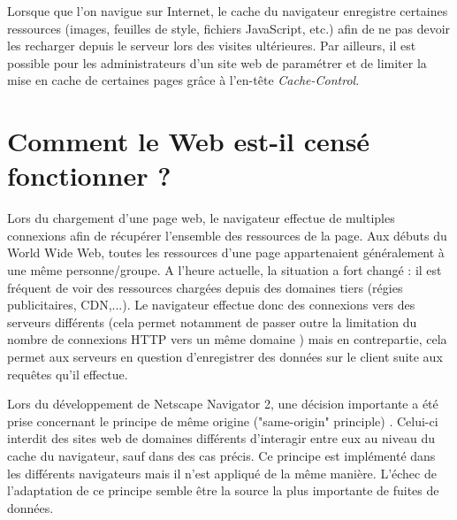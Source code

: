 Lorsque que l'on navigue sur Internet, le cache du navigateur enregistre certaines ressources (images, feuilles de style, fichiers JavaScript, etc.) afin de ne pas devoir les recharger depuis le serveur lors des visites ultérieures. Par ailleurs, il est possible pour les administrateurs d'un site web de paramétrer et de limiter la mise en cache de certaines pages grâce à l'en-tête \textit{Cache-Control}.


\section{Comment le Web est-il censé fonctionner ?}
\label{web-expl}
Lors du chargement d'une page web, le navigateur effectue de multiples connexions afin de récupérer l'ensemble des ressources de la page. Aux débuts du World Wide Web, toutes les ressources d'une page appartenaient généralement à une même personne/groupe. A l'heure actuelle, la situation a fort changé : il est fréquent de voir des ressources chargées depuis des domaines tiers (régies publicitaires, CDN,...). Le navigateur effectue donc des connexions vers des serveurs différents (cela permet notamment de passer outre la limitation du nombre de connexions HTTP vers un même domaine \cite{IETF_RFC2616}) mais en contrepartie, cela permet aux serveurs en question d'enregistrer des données sur le client suite aux requêtes qu'il effectue.
\newline

Lors du développement de Netscape Navigator 2, une décision importante a été prise concernant le principe de même origine ("same-origin" principle) \cite{Jackson:2006:PBS:1135777.1135884}. Celui-ci interdit des sites web de domaines différents d'interagir entre eux au niveau du cache du navigateur, sauf dans des cas précis. Ce principe est implémenté dans les différents navigateurs mais il n'est appliqué de la même manière. L'échec de l'adaptation de ce principe semble être la source la plus importante de fuites de données.
